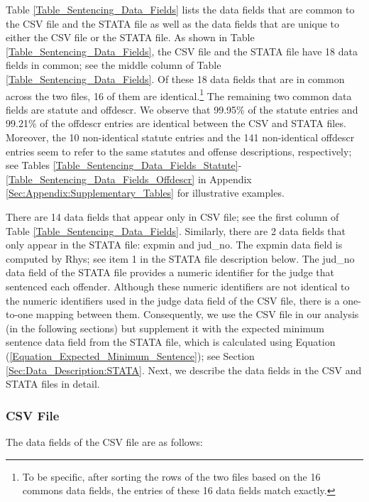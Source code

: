 \documentclass[11pt]{article}
\theoremstyle{ModifiedStyle}
\begin{document}
  	Table \ref{Table_Sentencing_Data_Fields} lists the data fields that are common to the CSV file and the STATA file as well as the data fields that are unique to either the CSV file or the STATA file. As shown in Table \ref{Table_Sentencing_Data_Fields}, the CSV file and the STATA file have 18 data fields in common; see the middle column of Table \ref{Table_Sentencing_Data_Fields}. Of these 18 data fields that are in common across the two files, 16 of them are identical.\footnote{To be specific, after sorting the rows of the two files based on the 16 commons data fields, the entries of these 16 data fields match exactly.} The remaining two common data fields are statute and offdescr. We observe that 99.95\% of the statute entries and 99.21\% of the offdescr entries are identical between the CSV and STATA files. Moreover, the 10 non-identical statute entries and the 141 non-identical offdescr entries seem to refer to the same statutes and offense descriptions, respectively; see Tables \ref{Table_Sentencing_Data_Fields_Statute}-\ref{Table_Sentencing_Data_Fields_Offdescr} in Appendix \ref{Sec:Appendix:Supplementary_Tables} for illustrative examples.

  	There are 14 data fields that appear only in CSV file; see the first column of Table \ref{Table_Sentencing_Data_Fields}. Similarly, there are 2 data fields that only appear in the STATA file: expmin and jud\_no. The expmin data field is computed by Rhys; see item 1 in the STATA file description below. The jud\_no data field of the STATA file provides a numeric identifier for the judge that sentenced each offender. Although these numeric identifiers are not identical to the numeric identifiers used in the judge data field of the CSV file, there is a one-to-one mapping between them. Consequently, we use the CSV file in our analysis (in the following sections) but supplement it with the expected minimum sentence data field from the STATA file, which is calculated using Equation (\ref{Equation_Expected_Minimum_Sentence}); see Section \ref{Sec:Data_Description:STATA}. Next, we describe the data fields in the CSV and STATA files in detail.

  	\subsubsection{CSV File}
    	\label{Sec:Data_Description:CSV}
      The data fields of the CSV file are as follows:
\end{document}
